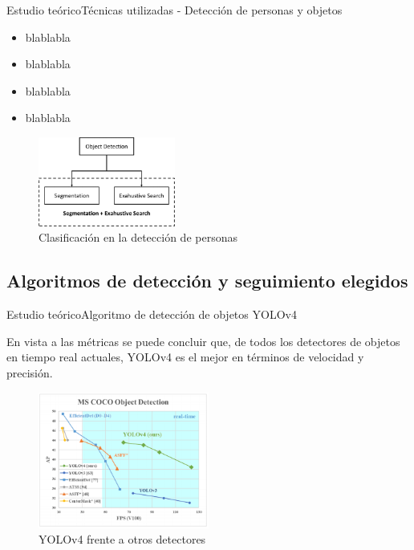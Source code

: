 
\begin{frame}{Estudio teórico}{Técnicas utilizadas - Detección de personas y objetos}

\begin{itemize}
    \item blablabla
    \item blablabla
    \item blablabla
    \item blablabla
\end{itemize}

\begin{figure}[ht]
\centering
\includegraphics[width=0.4\textwidth]{Images/estudio-teorico/people-detection-classification.png}
\caption{\label{fig:people-detection-classification}Clasificación en la detección de personas}
\end{figure}

\end{frame}


\subsection{Algoritmos de detección y seguimiento elegidos}

\begin{frame}{Estudio teórico}{Algoritmo de detección de objetos YOLOv4}

\justifying
En vista a las métricas se puede concluir que, de todos los detectores de objetos en tiempo real actuales, YOLOv4 es el mejor en términos de velocidad y precisión.

\begin{figure}[ht]
\centering
\includegraphics[width=0.5\textwidth]{Images/estudio-teorico/yolov4-vs-others.png}
\caption{\label{fig:yolov4-vs-others}YOLOv4 frente a otros detectores}
\end{figure}

\end{frame}

